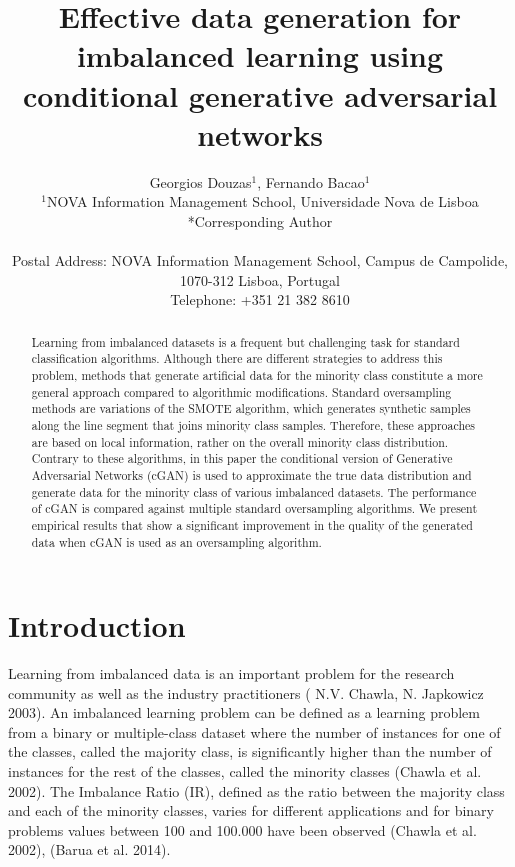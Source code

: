 \documentclass[parskip=full]{scrartcl}
\title{Effective data generation for imbalanced learning using conditional generative adversarial networks}
\author{
	Georgios Douzas\(^{1}\), Fernando Bacao\(^{1}\)
	\\
	\small{\(^{1}\)NOVA Information Management School, Universidade Nova de Lisboa}
	\\
	\small{*Corresponding Author}
	\\
	\\
	\small{Postal Address: NOVA Information Management School, Campus de Campolide, 1070-312 Lisboa, Portugal}
	\\
	\small{Telephone: +351 21 382 8610}
}
\date{}
\begin{document}
\maketitle

\begin{abstract}
Learning from imbalanced datasets is a frequent but challenging task for
standard classification algorithms. Although there are different strategies to
address this problem, methods that generate artificial data for the minority
class constitute a more general approach compared to algorithmic modifications.
Standard oversampling methods are variations of the SMOTE algorithm, which
generates synthetic samples along the line segment that joins minority class
samples. Therefore, these approaches are based on local information, rather on
the overall minority class distribution. Contrary to these algorithms, in this
paper the conditional version of Generative Adversarial Networks (cGAN) is used
to approximate the true data distribution and generate data for the minority
class of various imbalanced datasets.  The performance of cGAN is compared
against multiple standard oversampling algorithms. We present empirical results
that show a significant improvement in the quality of the generated data when
cGAN is used as an oversampling algorithm.
\end{abstract}

\section{Introduction}
Learning from imbalanced data is an important problem for the research community
as well as the industry practitioners ( N.V. Chawla, N. Japkowicz 2003). An
imbalanced learning problem can be defined as a learning problem from a binary
or multiple-class dataset where the number of instances for one of the classes,
called the majority class, is significantly higher than the number of instances
for the rest of the classes, called the minority classes (Chawla et al. 2002).
The Imbalance Ratio (IR), defined as the ratio between the majority class and
each of the minority classes, varies for different applications and for binary
problems values between 100 and 100.000 have been observed (Chawla et al. 2002),
(Barua et al. 2014).
\end{document}
